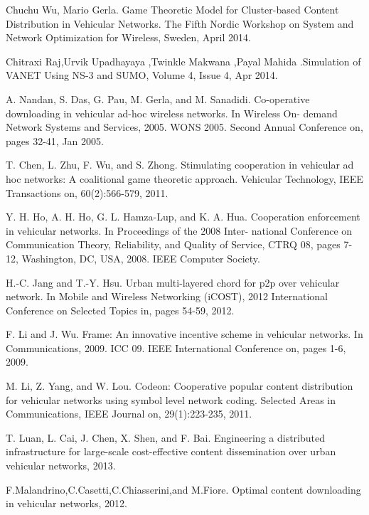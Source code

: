 \documentclass{acm_proc_article-sp}
\begin{document}
\begin{thebibliography}{1}
\vspace{1 mm}

Chuchu Wu, Mario Gerla. Game Theoretic Model for Cluster-based Content Distribution in Vehicular Networks. The Fifth Nordic Workshop on System and Network Optimization for Wireless, Sweden, April 2014.

Chitraxi Raj,Urvik Upadhayaya ,Twinkle Makwana ,Payal Mahida .Simulation of VANET Using NS-3 and SUMO, Volume 4, Issue 4, Apr 2014.

A. Nandan, S. Das, G. Pau, M. Gerla, and M. Sanadidi. Co-operative downloading in vehicular ad-hoc wireless networks. In Wireless On- demand Network Systems and Services, 2005. WONS 2005. Second Annual Conference on, pages 32-41, Jan 2005.

T. Chen, L. Zhu, F. Wu, and S. Zhong. Stimulating cooperation in vehicular ad hoc networks: A coalitional game theoretic approach. Vehicular Technology, IEEE Transactions on, 60(2):566-579, 2011.

Y. H. Ho, A. H. Ho, G. L. Hamza-Lup, and K. A. Hua. Cooperation enforcement in vehicular networks. In Proceedings of the 2008 Inter- national Conference on Communication Theory, Reliability, and Quality of Service, CTRQ 08, pages 7-12, Washington, DC, USA, 2008. IEEE Computer Society.

H.-C. Jang and T.-Y. Hsu. Urban multi-layered chord for p2p over vehicular network. In Mobile and Wireless Networking (iCOST), 2012 International Conference on Selected Topics in, pages 54-59, 2012.

F. Li and J. Wu. Frame: An innovative incentive scheme in vehicular networks. In Communications, 2009. ICC 09. IEEE International Conference on, pages 1-6, 2009.

M. Li, Z. Yang, and W. Lou. Codeon: Cooperative popular content distribution for vehicular networks using symbol level network coding. Selected Areas in Communications, IEEE Journal on, 29(1):223-235, 2011.

T. Luan, L. Cai, J. Chen, X. Shen, and F. Bai. Engineering a distributed infrastructure for large-scale cost-effective content dissemination over urban vehicular networks, 2013.

F.Malandrino,C.Casetti,C.Chiasserini,and M.Fiore. Optimal content downloading in vehicular networks, 2012.


\end{thebibliography}
\end{document}
